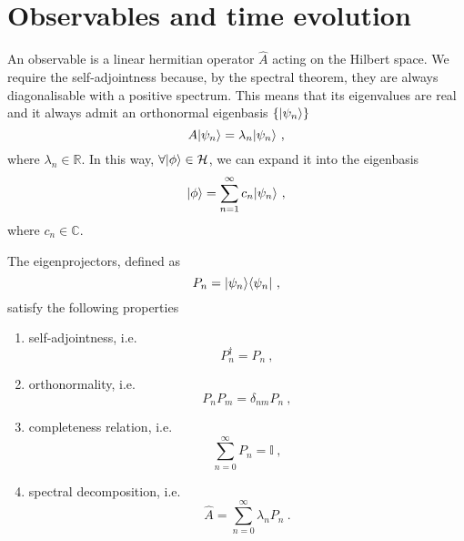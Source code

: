 \section{Observables and time evolution}

    An observable is a linear hermitian operator $\hat A$ acting on the Hilbert space. We require the self-adjointness because, by the spectral theorem, they are always diagonalisable with a positive spectrum. This means that its eigenvalues are real and it always admit an orthonormal eigenbasis $\{\vert\psi_n\rangle\}$
    \begin{equation}\label{eigen}
        A \vert\psi_n\rangle = \lambda_n \vert\psi_n\rangle ~,
    \end{equation}
    where $\lambda_n \in \mathbb R$. In this way, $\forall \vert\phi\rangle \in \mathcal H$, we can expand it into the eigenbasis 
    \begin{equation}\label{exp}
        \vert\phi\rangle = \sum_{n=1}^{\infty} c_n \vert\psi_n\rangle ~,
    \end{equation}
    where $c_n \in \mathbb C$.

    The eigenprojectors, defined as 
    \begin{equation*}
        P_n = \vert\psi_n\rangle \langle\psi_n\vert ~,
    \end{equation*}
    satisfy the following properties 
    \begin{enumerate}
        \item self-adjointness, i.e.
            \begin{equation*}
                P_n^\dagger = P_n ~,
            \end{equation*}
        \item orthonormality, i.e.
            \begin{equation*}
                P_n P_m = \delta_{nm} P_n ~,
            \end{equation*}
        \item completeness relation, i.e.
            \begin{equation}\label{compl}
                \sum_{n = 0}^{\infty} P_n = \mathbb I~,
            \end{equation}
        \item spectral decomposition, i.e.
            \begin{equation}\label{spec}
                \hat A = \sum_{n=0}^{\infty} \lambda_n P_n ~.
            \end{equation}
    \end{enumerate}

